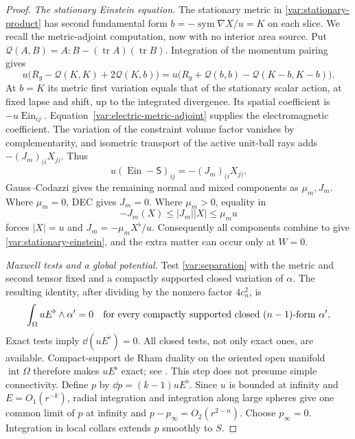 \begin{proof}
\emph{The stationary Einstein equation.}
The stationary metric in \eqref{var:stationary-product}
has second fundamental form
$b=-\operatorname{sym}\nabla X/u=K$ on each slice.
We recall the metric-adjoint computation, now with no
interior area source.  Put
$\mathcal Q(A,B)=A:B-(\operatorname{tr}A)(\operatorname{tr}B)$.
Integration of the momentum pairing gives
\begin{equation}
 u\bigl(R_g-\mathcal Q(K,K)+2\mathcal Q(K,b)\bigr)
 =u\bigl(R_g+\mathcal Q(b,b)-\mathcal Q(K-b,K-b)\bigr).
 \label{var:stationary-action}
\end{equation}
At $b=K$ its metric first variation equals that of the
stationary scalar action, at fixed lapse and shift, up to
the integrated divergence.  Its spatial coefficient is
$-u\operatorname{Ein}_{ij}$.
Equation~\eqref{var:electric-metric-adjoint} supplies
the electromagnetic coefficient.  The variation of the
constraint volume factor vanishes by complementarity,
and isometric transport of the active unit-ball rays
adds $-(J_m)_{(i}X_{j)}$.  Thus
\begin{equation}
 u(\operatorname{Ein}-\mathsf S)_{ij}
                         =-(J_m)_{(i}X_{j)}.
 \label{var:spatial-einstein-adjoint}
\end{equation}
Gauss--Codazzi gives the remaining normal and mixed
components as $\mu_m,J_m$.  Where $\mu_m=0$, DEC gives
$J_m=0$.  Where $\mu_m>0$, equality in
\begin{equation*}
 -J_m(X)\le |J_m||X|\le\mu_m u
 \end{equation*}
forces $|X|=u$ and $J_m=-\mu_m X^\flat/u$.
Consequently all components combine to give
\eqref{var:stationary-einstein}, and the extra matter
can occur only at $W=0$.

\emph{Maxwell tests and a global potential.}
Test \eqref{var:separation} with the metric and second
tensor fixed and a compactly supported closed variation
of $\alpha$.  The resulting identity, after dividing
by the nonzero factor $4c_n^2$, is
\begin{equation}
 \int_\Omega uE^\flat\wedge\alpha'=0
 \quad\hbox{for every compactly supported closed }
                         (n-1)\hbox{-form }\alpha'.
 \label{var:electric-form-test}
\end{equation}
Exact tests imply $\dd(uE^\flat)=0$.
All closed tests, not only exact ones, are available.
Compact-support de Rham duality on the oriented open
manifold $\operatorname{int}\Omega$ therefore makes
$uE^\flat$ exact; see \cite{BottTu1982}.  This step does
not presume simple connectivity.  Define $p$ by
$\dd p=(k-1)uE^\flat$.  Since $u$ is bounded at infinity
and $E=O_1(r^{-k})$, radial integration and integration
along large spheres give one common limit of $p$ at
infinity and $p-p_\infty=O_2(r^{2-n})$.
Choose $p_\infty=0$.  Integration in local collars
extends $p$ smoothly to $S$.


\end{proof}
